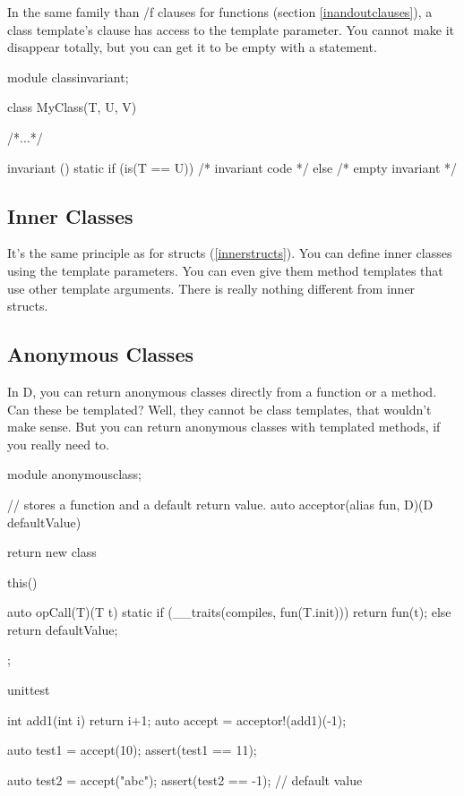 In the same family than /f clauses for functions (section \ref{inandoutclauses}), a class template's  clause has access to the template parameter. You cannot make it disappear totally, but you can get it to be empty with a  statement.

\begin{dcode}
module classinvariant;

class MyClass(T, U, V)
{
    /*...*/

    invariant ()
    {
        static if (is(T == U))
        {
            /* invariant code */
        }
        else
        { } /* empty invariant */
    }
}
\end{dcode}

\subsection{Inner Classes}\label{innerclasses}

It's the same principle as for structs (\ref{innerstructs}). You can define inner classes using the template parameters. You can even give them method templates that use other template arguments. There is really nothing different from inner structs.

\subsection{Anonymous Classes}\label{anonymousclasses}

In D, you can return anonymous classes directly from a function or a method. Can these be templated? Well, they cannot be class templates, that wouldn't make sense. But you can return anonymous classes with templated methods, if you really need to.

\begin{dcode}
module anonymousclass;

// stores a function and a default return value.
auto acceptor(alias fun, D)(D defaultValue)
{
    return new class 
    { 
        this() {}
        
        auto opCall(T)(T t)
        {
            static if (__traits(compiles, fun(T.init)))
                return fun(t); 
            else
                return defaultValue;
        }
    };
}

unittest
{
    int add1(int i) { return i+1;}
    auto accept = acceptor!(add1)(-1);
    
    auto test1 = accept(10); 
    assert(test1 == 11);

    auto test2 = accept("abc");
    assert(test2 == -1); // default value
}
\end{dcode}

